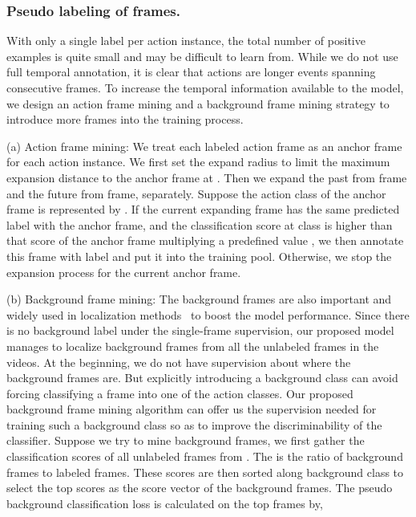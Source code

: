\documentclass[runningheads]{llncs}
\begin{document}
	\subsubsection{Pseudo labeling of frames.}
	
	With only a single label per action instance, the total number of positive examples is quite small and may be difficult to learn from.  While we do not use full temporal annotation, it is clear that actions are longer events spanning consecutive frames.
	To increase the temporal information available to the model, we design an action frame mining and a background frame mining strategy to introduce more frames into the training process.
	
	
	(a) Action frame mining:
	We treat each labeled action frame as an anchor frame for each action instance.  
	We first set the expand radius  to limit the maximum expansion distance to the anchor frame at .
	Then we expand the past from  frame and the future from  frame, separately. 
	Suppose the action class of the anchor frame is represented by .
	If the current expanding frame has the same predicted label with the anchor frame, and the classification score at  class is higher than that score of the anchor frame multiplying a predefined value , we then annotate this frame with label  and put it into the training pool. 
	Otherwise, we stop the expansion process for the current anchor frame.
	
	
	(b) Background frame mining:
	The background frames are also important and widely used in localization methods~\cite{Liu_2019_CVPR,Nguyen_2019_ICCV} to boost the model performance.  
	Since there is no background label under the single-frame supervision, our proposed model manages to localize background frames from all the unlabeled frames in the  videos. 
At the beginning, we do not have supervision about where the background frames are. But explicitly introducing a background class can avoid forcing classifying a frame into one of the action classes. Our proposed background frame mining algorithm can offer us the supervision needed for training such a background class so as to improve the discriminability of the classifier.
	Suppose we try to mine  background frames, we first gather the classification scores of all unlabeled frames from . The  is the ratio of background frames to labeled frames.
	These scores are then sorted along background class to select the top  scores  as the score vector of the background frames. 
	The pseudo background classification loss is calculated on the top  frames by,
	
\end{document}
